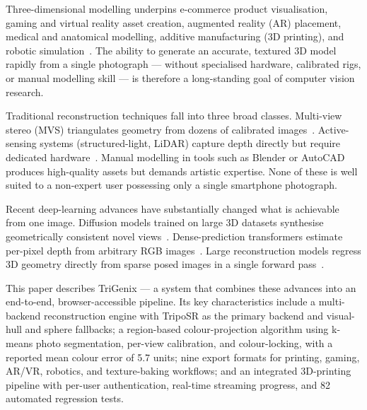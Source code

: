 \documentclass[conference]{IEEEtran}
\begin{document}
Three-dimensional modelling underpins e-commerce product visualisation, gaming and virtual reality asset creation,
augmented reality (AR) placement, medical and anatomical modelling, additive manufacturing (3D printing), and
robotic simulation~\cite{survey_3d}. The ability to generate an accurate, textured 3D model rapidly from a single
photograph — without specialised hardware, calibrated rigs, or manual modelling skill — is therefore a long-standing
goal of computer vision research.

Traditional reconstruction techniques fall into three broad classes. Multi-view stereo (MVS) triangulates geometry
from dozens of calibrated images~\cite{mvs}. Active-sensing systems (structured-light, LiDAR) capture depth
directly but require dedicated hardware~\cite{active_sensing}. Manual modelling in tools such as Blender or
AutoCAD produces high-quality assets but demands artistic expertise. None of these is well suited to a non-expert
user possessing only a single smartphone photograph.

Recent deep-learning advances have substantially changed what is achievable from one image. Diffusion models
trained on large 3D datasets synthesise geometrically consistent novel views~\cite{zero123pp}. Dense-prediction
transformers estimate per-pixel depth from arbitrary RGB images~\cite{dpt}. Large reconstruction models regress
3D geometry directly from sparse posed images in a single forward pass~\cite{lrm,triposr,instantmesh}.

This paper describes TriGenix — a system that combines these advances into an end-to-end, browser-accessible
pipeline. Its key characteristics include a multi-backend reconstruction engine with TripoSR as the primary
backend and visual-hull and sphere fallbacks; a region-based colour-projection algorithm using k-means photo
segmentation, per-view calibration, and colour-locking, with a reported mean colour error of 5.7 units; nine
export formats for printing, gaming, AR/VR, robotics, and texture-baking workflows; and an integrated
3D-printing pipeline with per-user authentication, real-time streaming progress, and 82 automated regression
tests.
\end{document}
